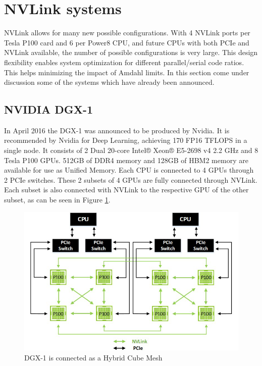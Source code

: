 
\section{NVLink systems}
NVLink allows for many new possible configurations.
With 4 NVLink ports per Tesla P100 card and 6 per Power8 CPU, and future CPUs with both PCIe and NVLink available, the number of possible configurations is very large.
This design flexibility enables system optimization for different parallel/serial code ratios.
This helps minimizing the impact of Amdahl limits.
In this section come under discussion some of the systems which have already been announced.

\subsection{NVIDIA DGX-1}
In April 2016 the DGX-1 was announced to be produced by Nvidia.
It is recommended by Nvidia for Deep Learning, achieving 170 FP16 TFLOPS in a single node.
It consists of 2 Dual 20-core Intel® Xeon® E5-2698 v4 2.2 GHz and 8 Tesla P100 GPUs.
512GB of DDR4 memory and 128GB of HBM2 memory are available for use as Unified Memory.
Each CPU is connected to 4 GPUs through 2 PCIe switches.
These 2 subsets of 4 GPUs are fully connected through NVLink.
Each subset is also connected with NVLink to the respective GPU of the other subset, as can be seen in Figure \ref{fig:hybrid-cube-mesh}.

\begin{figure}[ht!]
    \centering
    \includegraphics[width=\linewidth]{hybrid-cube-mesh}
    \caption{DGX-1 is connected as a Hybrid Cube Mesh \cite{nvidia:pascalwhitepaper}}
    \label{fig:hybrid-cube-mesh}
\end{figure}

